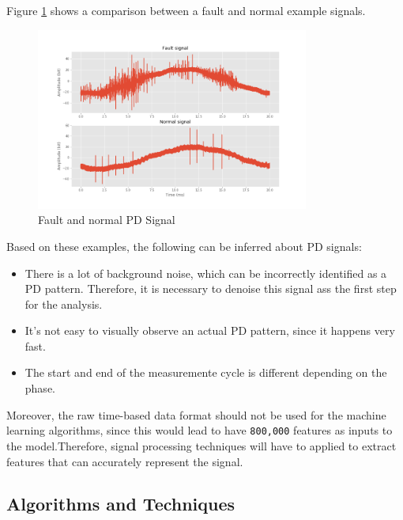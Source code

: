 \documentclass[11pt]{article}
\providecommand{\tightlist}{%
      \setlength{\itemsep}{0pt}\setlength{\parskip}{0pt}}
\begin{document}
Figure \ref{fig:pdsignal_fd} shows a comparison between a fault and normal example
signals. 

\begin{figure}[h!]
	\centering
	\includegraphics[width=0.8\textwidth]{signal_fault_normal_raw.png}
	\caption{Fault and normal PD Signal}
	\label{fig:pdsignal_fd}
\end{figure}

Based on these examples, the following can be inferred about PD signals:

\begin{itemize}
\tightlist
\item
  There is a lot of background noise, which can be incorrectly
  identified as a PD pattern. Therefore, it is necessary to denoise this
  signal ass the first step for the analysis.
\item
  It's not easy to visually observe an actual PD pattern, since it
  happens very fast.
\item
  The start and end of the measuremente cycle is different depending on
  the phase.
\end{itemize}

Moreover, the raw time-based data format should not be used for the
machine learning algorithms, since this would lead to have
\texttt{800,000} features as inputs to the model.Therefore, signal
processing techniques will have to applied to extract features that can
accurately represent the signal.



\hypertarget{algorithms-and-techniques}{%
\subsection{Algorithms and
Techniques}\label{algorithms-and-techniques}}
\end{document}
